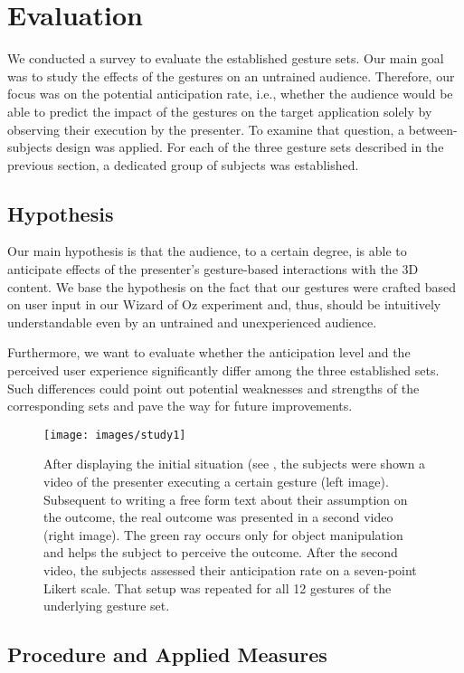 \documentclass{sigchi}
\begin{document}
\section{Evaluation}
We conducted a survey to evaluate the established gesture sets. Our main goal was to study the effects of the gestures on an untrained audience. Therefore, our focus was on the potential anticipation rate, i.e., whether the audience would be able to predict the impact of the gestures on the target application solely by observing their execution by the presenter. To examine that question, a between-subjects design was applied. For each of the three gesture sets described in the previous section, a dedicated group of subjects was established. 


\subsection{Hypothesis}
Our main hypothesis is that the audience, to a certain degree, is able to anticipate effects of the presenter’s gesture-based interactions with the 3D content. We base the hypothesis on the fact that our gestures were crafted based on user input in our Wizard of Oz experiment and, thus, should be intuitively understandable even by an untrained and unexperienced audience.

Furthermore, we want to evaluate whether the anticipation level and the perceived user experience significantly differ among the three established sets. Such differences could point out potential weaknesses and strengths of the corresponding sets and pave the way for future improvements.


\begin{figure*}[t!]
\centering
\texttt{[image: images/study1]}
\vskip-1mm
\caption{After displaying the initial situation (see , the subjects were shown a video of the presenter executing a certain gesture (left image). Subsequent to writing a free form text about their assumption on the outcome, the real outcome was presented in a second video (right image). The green ray occurs only for object manipulation and helps the subject to perceive the outcome. After the second video, the subjects assessed their anticipation rate on a seven-point Likert scale. That setup was repeated for all 12 gestures of the underlying gesture set.}
\label{fig:setup}
\vskip-1mm
\end{figure*}



\subsection{Procedure and Applied Measures}
\end{document}
